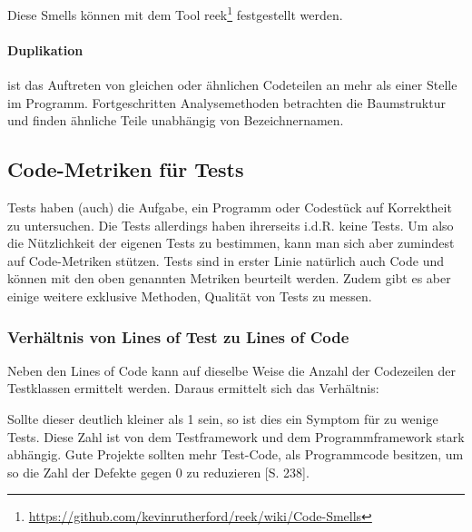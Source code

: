 Diese Smells können mit dem Tool reek\footnote{\url{https://github.com/kevinrutherford/reek/wiki/Code-Smells}} festgestellt werden.
\paragraph{Duplikation} ist das Auftreten von gleichen oder ähnlichen Codeteilen an mehr als einer Stelle im Programm. Fortgeschritten Analysemethoden betrachten die Baumstruktur und finden ähnliche Teile unabhängig von Bezeichnernamen.

\subsection{Code-Metriken für Tests}
\label{sec:metrics}
Tests haben (auch) die Aufgabe, ein Programm oder Codestück auf Korrektheit zu untersuchen. Die Tests allerdings haben ihrerseits i.d.R. keine Tests. Um also die Nützlichkeit der eigenen Tests zu bestimmen, kann man sich aber zumindest auf Code-Metriken stützen.
Tests sind in erster Linie natürlich auch Code und können mit den oben genannten Metriken beurteilt werden. Zudem gibt es aber einige weitere exklusive Methoden, Qualität von Tests zu messen. 

\subsubsection{Verhältnis von Lines of Test zu Lines of Code}
Neben den Lines of Code kann auf dieselbe Weise die Anzahl der Codezeilen der Testklassen ermittelt werden. Daraus ermittelt sich das Verhältnis:


Sollte dieser deutlich kleiner als 1 sein, so ist dies ein Symptom für zu wenige Tests. Diese Zahl ist von dem Testframework und dem Programmframework stark abhängig. Gute Projekte sollten mehr Test-Code, als Programmcode besitzen, um so die Zahl der Defekte gegen 0 zu reduzieren \citep{hunt_pragmatic_1999}[S. 238]. 
        

